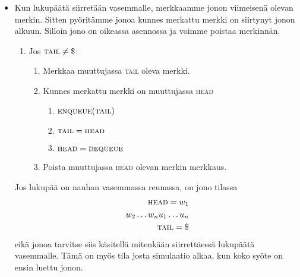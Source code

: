 \documentclass[finnish,11pt,draft]{article}
\begin{document}
\begin{enumerate}
\begin{itemize}
\item
  Kun lukupäätä siirretään vasemmalle, merkkaamme jonon viimeisenä olevan
  merkin. Sitten pyö\-ri\-täm\-me jonoa kunnes merkattu merkki on siirtynyt
  jonon alkuun. Silloin jono on oikeassa asennossa ja voimme poistaa
  merkinnän.
%
  \begin{enumerate}[label=\arabic*.]
  \item
    Jos $\textsc{tail} \neq \$$:
    \begin{enumerate}[label=\arabic*.]
    \item
      Merkkaa muuttujassa \textsc{tail} oleva merkki.
    \item
      Kunnes merkattu merkki on muuttujassa \textsc{head}
      \begin{enumerate}[label=\arabic*.]
      \item
        $\textsc{enqueue}(\textsc{tail})$
      \item
        $\textsc{tail} = \textsc{head}$
      \item
        $\textsc{head} = \textsc{dequeue}$
      \end{enumerate}
    \item
      Poista muuttujassa \textsc{head} olevan merkin merkkaus.
    \end{enumerate}
  \end{enumerate}

  Jos lukupää on nauhan vasemmassa reunassa, on jono tilassa
%
  \begin{align*}
    \textsc{head} = w_1 \\
    w_2 \dots w_nu_1 \dots u_n \\
    \textsc{tail} = \$
  \end{align*}
%
  eikä jonoa tarvitse siis käsitellä mitenkään siirrettäessä lukupäätä
  vasemmalle. Tämä on myös tila josta simulaatio alkaa, kun koko syöte on
  ensin luettu jonon.
\end{itemize}


\end{enumerate}
\end{document}
